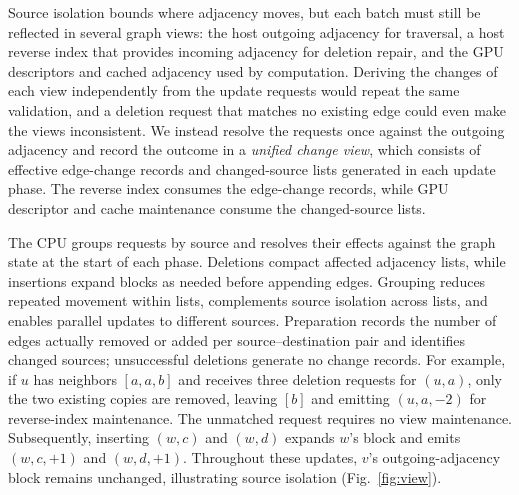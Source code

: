 
Source isolation bounds where adjacency moves, but each batch must still be reflected in several graph views: the host outgoing adjacency for traversal, a host reverse index that provides incoming adjacency for deletion repair, and the GPU descriptors and cached adjacency used by computation. Deriving the changes of each view independently from the update requests would repeat the same validation, and a deletion request that matches no existing edge could even make the views inconsistent. We instead resolve the requests once against the outgoing adjacency and record the outcome in a \textit{unified change view}, which consists of effective edge-change records and changed-source lists generated in each update phase. The reverse index consumes the edge-change records, while GPU descriptor and cache maintenance consume the changed-source lists.

The CPU groups requests by source and resolves their effects against the graph state at the start of each phase. Deletions compact affected adjacency lists, while insertions expand blocks as needed before appending edges. Grouping reduces repeated movement within lists, complements source isolation across lists, and enables parallel updates to different sources. Preparation records the number of edges actually removed or added per source--destination pair and identifies changed sources; unsuccessful deletions generate no change records. For example, if $u$ has neighbors $[a,a,b]$ and receives three deletion requests for $(u,a)$, only the two existing copies are removed, leaving $[b]$ and emitting $(u,a,-2)$ for reverse-index maintenance. The unmatched request requires no view maintenance. Subsequently, inserting $(w,c)$ and $(w,d)$ expands $w$'s block and emits $(w,c,+1)$ and $(w,d,+1)$. Throughout these updates, $v$'s outgoing-adjacency block remains unchanged, illustrating source isolation (Fig.~\ref{fig:view}).

